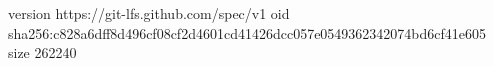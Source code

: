 version https://git-lfs.github.com/spec/v1
oid sha256:c828a6dff8d496cf08cf2d4601cd41426dcc057e0549362342074bd6cf41e605
size 262240
